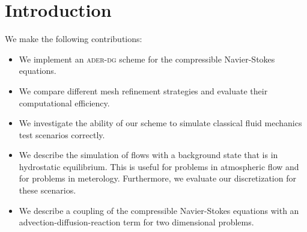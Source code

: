 \chapter{Introduction}\label{chap:introduction}
We make the following contributions:

\begin{itemize}
\item We implement an \textsc{ader-dg} scheme for the compressible Navier-Stokes equations.
\item We compare different mesh refinement strategies and evaluate their computational efficiency.
\item We investigate the ability of our scheme to simulate classical fluid mechanics test scenarios correctly.
\item We describe the simulation of flows with a background state that is in hydrostatic equilibrium.
  This is useful for problems in atmospheric flow and for problems in meterology.
  Furthermore, we evaluate our discretization for these scenarios.
\item We describe a coupling of the compressible Navier-Stokes equations with an advection-diffusion-reaction term for two dimensional problems.
\end{itemize}

